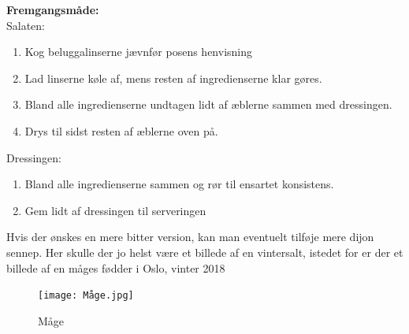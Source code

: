 \documentclass{book}
\begin{document}
\begin{minipage}[t]{0.5\textwidth} 
\textbf{Fremgangsmåde:}
\\ Salaten:
\begin{enumerate}
    \item Kog beluggalinserne jævnfør posens henvisning
    \item Lad linserne køle af, mens resten af ingredienserne klar gøres.
    \item Bland alle ingredienserne undtagen lidt af æblerne sammen med dressingen.
    \item Drys til sidst resten af æblerne oven på.
\end{enumerate}
Dressingen:
\begin{enumerate}
    \item Bland alle ingredienserne sammen og rør til ensartet konsistens.
    \item Gem lidt af dressingen til serveringen
\end{enumerate}
\end{minipage}
Hvis der ønskes en mere bitter version, kan man eventuelt tilføje mere dijon sennep.
\newpage  Her skulle der jo helst være et billede af en vintersalt, istedet for er der et billede af en måges fødder i Oslo, vinter 2018
\begin{figure}
    \centering
    \texttt{[image: Måge.jpg]}
    \caption{Måge}
    
\end{figure}
\end{document}
